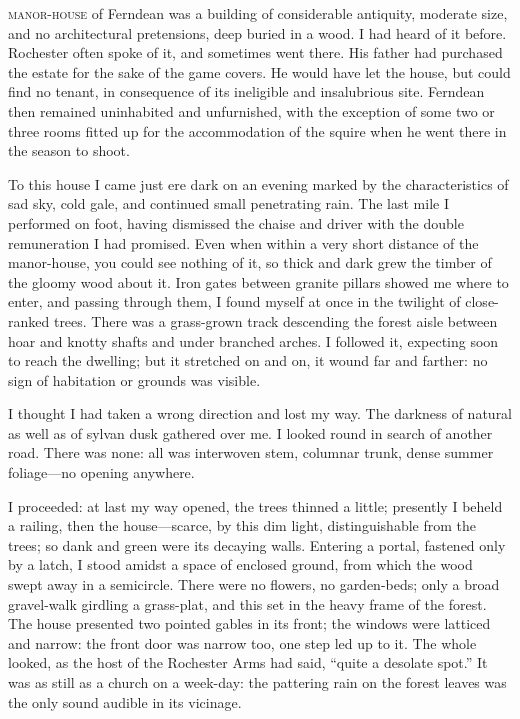 
 \textsc{manor-house} of Ferndean was a building of considerable antiquity,
moderate size, and no architectural pretensions, deep buried in a wood.
I had heard of it before. \Mr{} Rochester often spoke of it, and
sometimes went there. His father had purchased the estate for the sake
of the game covers. He would have let the house, but could find no
tenant, in consequence of its ineligible and insalubrious site.
Ferndean then remained uninhabited and unfurnished, with the exception
of some two or three rooms fitted up for the accommodation of the squire
when he went there in the season to shoot.

To this house I came just ere dark on an evening marked by the
characteristics of sad sky, cold gale, and continued small penetrating
rain. The last mile I performed on foot, having dismissed the chaise
and driver with the double remuneration I had promised. Even when
within a very short distance of the manor-house, you could see nothing
of it, so thick and dark grew the timber of the gloomy wood about it.
Iron gates between granite pillars showed me where to enter, and passing
through them, I found myself at once in the twilight of close-ranked
trees. There was a grass-grown track descending the forest aisle
between hoar and knotty shafts and under branched arches. I followed
it, expecting soon to reach the dwelling; but it stretched on and on, it
wound far and farther: no sign of habitation or grounds was visible.

I thought I had taken a wrong direction and lost my way. The darkness
of natural as well as of sylvan dusk gathered over me. I looked round
in search of another road. There was none: all was interwoven stem,
columnar trunk, dense summer foliage---no opening anywhere.

I proceeded: at last my way opened, the trees thinned a little;
presently I beheld a railing, then the house---scarce, by this dim
light, distinguishable from the trees; so dank and green were its
decaying walls. Entering a portal, fastened only by a latch, I stood
amidst a space of enclosed ground, from which the wood swept away in a
semicircle. There were no flowers, no garden-beds; only a broad
gravel-walk girdling a grass-plat, and this set in the heavy frame of
the forest. The house presented two pointed gables in its front; the
windows were latticed and narrow: the front door was narrow too, one
step led up to it. The whole looked, as the host of the Rochester Arms
had said, \enquote{quite a desolate spot.} It was as still as a church
on a week-day: the pattering rain on the forest leaves was the only
sound audible in its vicinage.

